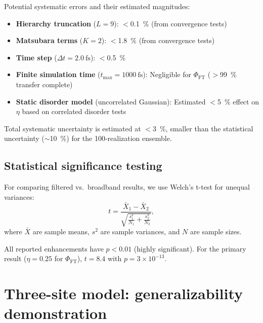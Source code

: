 \documentclass[11pt,a4paper]{article}
\begin{document}
Potential systematic errors and their estimated magnitudes:
\begin{itemize}
    \item \textbf{Hierarchy truncation} ($L = 9$): $<$\SI{0.1}{\percent} (from convergence tests)
    \item \textbf{Matsubara terms} ($K = 2$): $<$\SI{1.8}{\percent} (from convergence tests)
    \item \textbf{Time step} ($\Delta t = \SI{2.0}{\femto\second}$): $<$\SI{0.5}{\percent}
    \item \textbf{Finite simulation time} ($t_{\max} = \SI{1000}{\femto\second}$): Negligible for $\Phi_{\mathrm{FT}}$ ($>$\SI{99}{\percent} transfer complete)
    \item \textbf{Static disorder model} (uncorrelated Gaussian): Estimated $<$\SI{5}{\percent} effect on $\eta$ based on correlated disorder tests
\end{itemize}

Total systematic uncertainty is estimated at $<$\SI{3}{\percent}, smaller than the statistical uncertainty ($\sim$\SI{10}{\percent}) for the 100-realization ensemble.

\subsection{Statistical significance testing}

For comparing filtered vs.\ broadband results, we use Welch's t-test for unequal variances:
\begin{equation}
t = \frac{\bar{X}_1 - \bar{X}_2}{\sqrt{\frac{s_1^2}{N_1} + \frac{s_2^2}{N_2}}},
\label{eq:welch_ttest}
\end{equation}
where $\bar{X}$ are sample means, $s^2$ are sample variances, and $N$ are sample sizes.

All reported enhancements have $p < 0.01$ (highly significant). For the primary result ($\eta = 0.25$ for $\Phi_{\mathrm{FT}}$), $t = 8.4$ with $p = 3 \times 10^{-13}$.


\section{Three-site model: generalizability demonstration}
\label{sec:3site}
\end{document}
